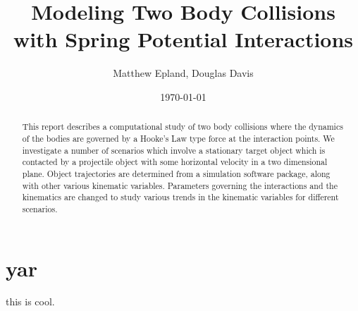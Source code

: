 \documentclass[aps,prl,floatfix,preprint,nofootinbib]{revtex4}
\begin{document}
\title{Modeling Two Body Collisions with Spring Potential Interactions}
\author{Matthew Epland, Douglas Davis}
\date{\today}
\begin{abstract}
  This report describes a computational study of two body collisions where the dynamics of the bodies are governed by a Hooke's Law type force at the interaction points. We investigate a number of scenarios which involve a stationary target object which is contacted by a projectile object with some horizontal velocity in a two dimensional plane. Object trajectories are determined from a simulation software package, along with other various kinematic variables. Parameters governing the interactions and the kinematics are changed to study various trends in the kinematic variables for different scenarios.
\end{abstract}\maketitle
\section{yar}
this is cool.
\end{document}
